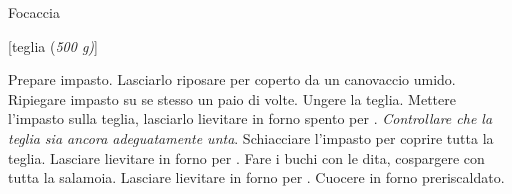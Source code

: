 \begin{recipe}{Focaccia}
    \begin{header}
        [teglia (\textit{500 g)}]

    \end{header}
    
    \begin{ingredients}[13]

    \end{ingredients}
    
    \begin{preparation}
        \step Prepare impasto.
        \step Lasciarlo riposare per  coperto da un canovaccio umido.
        \step Ripiegare impasto su se stesso un paio di volte.
        \step Ungere la teglia.
        \step Mettere l'impasto sulla teglia, lasciarlo lievitare in forno spento per .
        \step \textit{Controllare che la teglia sia ancora adeguatamente unta}.
        \step Schiacciare l'impasto per coprire tutta la teglia.
        \step Lasciare lievitare in forno per .
        \step Fare i buchi con le dita, cospargere con tutta la salamoia.
        \step Lasciare lievitare in forno per .
        \step Cuocere in forno preriscaldato.
    \end{preparation}
\end{recipe}

